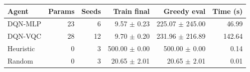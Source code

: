 \begin{tabular}{lrrrrr}
\hline
Agent & Params & Seeds & Train final & Greedy eval & Time (s) \\
\hline
DQN-MLP & 23 & 6 & 9.57 $\pm$ 0.23 & 225.07 $\pm$ 245.00 & 46.99 \\
DQN-VQC & 28 & 12 & 9.70 $\pm$ 0.20 & 231.96 $\pm$ 216.89 & 142.64 \\
Heuristic & 0 & 3 & 500.00 $\pm$ 0.00 & 500.00 $\pm$ 0.00 & 0.14 \\
Random & 0 & 3 & 20.65 $\pm$ 2.01 & 20.65 $\pm$ 2.01 & 0.01 \\
\hline
\end{tabular}
